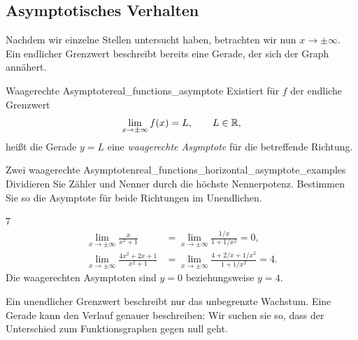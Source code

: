 \subsection{Asymptotisches Verhalten}
\label{subsec:real_functions_asymptotes}
Nachdem wir einzelne Stellen untersucht haben, betrachten wir nun
$x\to\pm\infty$. Ein endlicher Grenzwert beschreibt bereits eine Gerade,
der sich der Graph annähert.

\par\noindent\begin{minipage}{\linewidth}
\begin{DefinitionBox}{Waagerechte Asymptote}{real_functions_asymptote}
  Existiert für $f$ der endliche Grenzwert
  \[
    \lim_{x\to\pm\infty}f(x)=L,\qquad L\in\mathbb{R},
  \]
  heißt die Gerade $y=L$ eine \emph{waagerechte Asymptote}
   für die betreffende Richtung.
\end{DefinitionBox}
\begin{ExampleBox}{Zwei waagerechte Asymptoten}{real_functions_horizontal_asymptote_examples}
  Dividieren Sie Zähler und Nenner durch die höchste Nennerpotenz.
  Bestimmen Sie so die Asymptote für beide Richtungen im Unendlichen.
  \begin{ClozeArea}[34]{7}
    \[
      \begin{aligned}
        \lim_{x\to\pm\infty}\frac{x}{x^2+1}
          &=\lim_{x\to\pm\infty}\frac{1/x}{1+1/x^2}=0,\\[0.8em]
        \lim_{x\to\pm\infty}\frac{4x^2+2x+1}{x^2+1}
          &=\lim_{x\to\pm\infty}\frac{4+2/x+1/x^2}{1+1/x^2}=4.
      \end{aligned}
    \]
    Die waagerechten Asymptoten sind $y=0$ beziehungsweise $y=4$.
  \end{ClozeArea}
  \begin{center}
  \end{center}
\end{ExampleBox}
\end{minipage}

Ein unendlicher Grenzwert beschreibt nur das unbegrenzte Wachstum.
Eine Gerade kann den Verlauf genauer beschreiben: Wir suchen sie so,
dass der Unterschied zum Funktionsgraphen gegen null geht.

